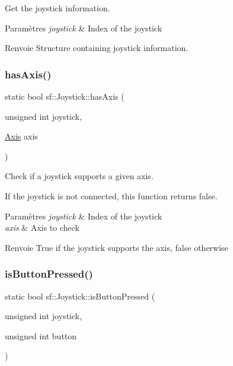 Get the joystick information. 


\begin{DoxyParams}{Paramètres}
{\em joystick} & Index of the joystick\\
\hline
\end{DoxyParams}
\begin{DoxyReturn}{Renvoie}
Structure containing joystick information. 
\end{DoxyReturn}
\mbox{\label{classsf_1_1Joystick_a268e8f2a11ae6af4a47c727cb4ab4d95}} 
\subsubsection{\texorpdfstring{has\+Axis()}{hasAxis()}}
{\footnotesize\ttfamily static bool sf\+::\+Joystick\+::has\+Axis (\begin{DoxyParamCaption}\item[{unsigned int}]{joystick,  }\item[{\hyperlink{classsf_1_1Joystick_a48db337092c2e263774f94de6d50baa7}{Axis}}]{axis }\end{DoxyParamCaption})\hspace{0.3cm}{\ttfamily [static]}}



Check if a joystick supports a given axis. 

If the joystick is not connected, this function returns false.


\begin{DoxyParams}{Paramètres}
{\em joystick} & Index of the joystick \\
\hline
{\em axis} & Axis to check\\
\hline
\end{DoxyParams}
\begin{DoxyReturn}{Renvoie}
True if the joystick supports the axis, false otherwise 
\end{DoxyReturn}
\mbox{\label{classsf_1_1Joystick_ae0d97a4b84268cbe6a7078e1b2717835}} 
\subsubsection{\texorpdfstring{is\+Button\+Pressed()}{isButtonPressed()}}
{\footnotesize\ttfamily static bool sf\+::\+Joystick\+::is\+Button\+Pressed (\begin{DoxyParamCaption}\item[{unsigned int}]{joystick,  }\item[{unsigned int}]{button }\end{DoxyParamCaption})\hspace{0.3cm}{\ttfamily [static]}}



